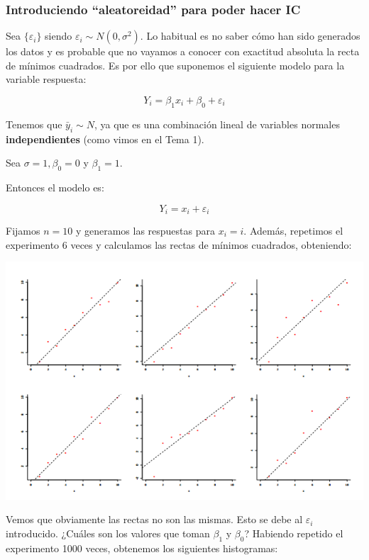\subsubsection{Introduciendo ``aleatoreidad'' para poder hacer IC}

Sea $\{ε_i\}$ siendo $ε_i \sim N(0,σ^2)$. Lo habitual es no saber cómo han sido generados los datos y es probable que no vayamos a conocer con exactitud absoluta la recta de mínimos cuadrados. Es por ello que suponemos el siguiente modelo para la variable respuesta:

\[
Y_i = β_1 x_i + β_0 + ε_i
\]


Tenemos que $\bar{y}_i \sim N$, ya que es una combinación lineal de variables normales \textbf{independientes} (como vimos en el Tema 1).


\begin{example}
Sea $σ=1, β_0 = 0$ y $β_1 = 1$.

Entonces el modelo es:

\[
Y_i = x_i + ε_i
\]

Fijamos $n=10$ y generamos las respuestas para $x_i = i$. Además, repetimos el experimento 6 veces y calculamos las rectas de mínimos cuadrados, obteniendo:

\begin{center}
\includegraphics[scale=0.6]{img/6ejemplosRegresion.png}
\end{center}

Vemos que obviamente las rectas no son las mismas. Esto se debe al $ε_i$ introducido. ¿Cuáles son los valores que toman $β_1$ y $β_0$? Habiendo repetido el experimento 1000 veces, obtenemos los siguientes histogramas:


\end{example}
